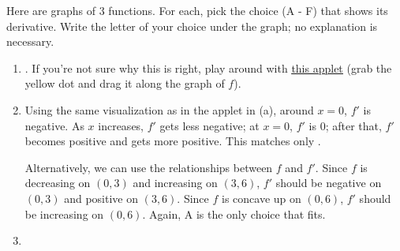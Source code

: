 \documentclass{article}
\makeatletter
\let\@href=\href
\renewcommand{\href}[2]{\@href{#1}{\ul{#2}}}
\theoremstyle{theorem}
\makeatother
\begin{document}
\begin{enumerate}
  Here are graphs of 3 functions. For each, pick the choice (A - F) that shows its derivative. Write the letter of your choice under the graph; no explanation is necessary. 

    \begin{enumerate}

    \item 

      \begin{solution}
        . If you're not sure why this is right, play around with \href{https://www.geogebra.org/m/dwkaxsrs}{this applet} (grab the yellow dot and drag it along the graph of $f$).
      \end{solution}

    \item 


      \begin{solution}
        Using the same visualization as in the applet in (a), around $x = 0$, $f'$ is negative. As $x$ increases, $f'$ gets less negative; at $x = 0$, $f'$ is 0; after that, $f'$ becomes positive and gets more positive. This matches only .

        Alternatively, we can use the relationships between $f$ and $f'$. Since $f$ is decreasing on $(0, 3)$ and increasing on $(3, 6)$, $f'$ should be negative on $(0, 3)$ and positive on $(3, 6)$. Since $f$ is concave up on $(0, 6)$, $f'$ should be increasing on $(0, 6)$. Again, A is the only choice that fits. 
      \end{solution} 

    \item 



\end{enumerate}
\end{enumerate}
\end{document}
